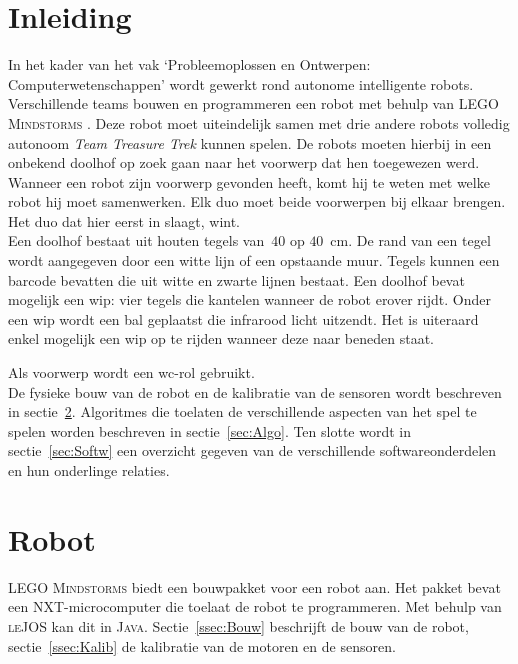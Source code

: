 \documentclass[eind]{penoverslag}
\begin{document}
\newpage
\setcounter{tocdepth}{3}
\tableofcontents
\newpage

\section{Inleiding} %
\label{ssec:Inl}
In het kader van het vak `Probleemoplossen en Ontwerpen: Computerwetenschappen' wordt gewerkt rond autonome intelligente robots. Verschillende teams bouwen en programmeren een robot met behulp van \textsc{LEGO Mindstorms} \cite{mindstorms}. Deze robot moet uiteindelijk samen met drie andere robots volledig autonoom \textit{Team Treasure Trek} kunnen spelen.
De robots moeten hierbij in een onbekend doolhof op zoek gaan naar het voorwerp dat hen toegewezen werd. Wanneer een robot zijn voorwerp gevonden heeft, komt hij te weten met welke robot hij moet samenwerken. Elk duo moet beide voorwerpen bij elkaar brengen. Het duo dat hier eerst in slaagt, wint.\\

Een doolhof bestaat uit houten tegels van~$40$ op $40$~cm. De rand van een tegel wordt aangegeven door een witte lijn of een opstaande muur. Tegels kunnen een barcode bevatten die uit witte en zwarte lijnen bestaat. Een doolhof bevat mogelijk een wip: vier tegels die kantelen wanneer de robot erover rijdt. Onder een wip wordt een bal geplaatst die infrarood licht uitzendt. Het is uiteraard enkel mogelijk een wip op te rijden wanneer deze naar beneden staat.

Als voorwerp wordt een wc-rol gebruikt.\\

De fysieke bouw van de robot en de kalibratie van de sensoren wordt beschreven in sectie~\ref{sec:Robot}. Algoritmes die toelaten de verschillende aspecten van het spel te spelen worden beschreven in sectie~\ref{sec:Algo}. Ten slotte wordt in sectie~\ref{sec:Softw} een overzicht gegeven van de verschillende softwareonderdelen en hun onderlinge relaties.

\section{Robot}
\label{sec:Robot}
\textsc{LEGO Mindstorms} biedt een bouwpakket voor een robot aan. Het pakket bevat een \textsc{NXT}-microcomputer die toelaat de robot te programmeren. Met behulp van \textsc{leJOS} \cite{leJOS} kan dit in \textsc{Java}. Sectie~\ref{ssec:Bouw} beschrijft de bouw van de robot, sectie~\ref{ssec:Kalib} de kalibratie van de motoren en de sensoren.
\end{document}
